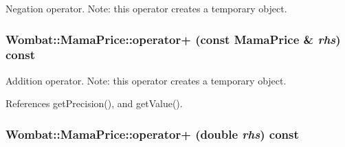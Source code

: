 Negation operator. Note: this operator creates a temporary object. \hypertarget{classWombat_1_1MamaPrice_a9ec014c02cdee65cf06c1e96e6338c92}{
\subsubsection[{operator+}]{ Wombat::MamaPrice::operator+ (const {\bf MamaPrice} \& {\em rhs}) const}}
\label{classWombat_1_1MamaPrice_a9ec014c02cdee65cf06c1e96e6338c92}


Addition operator. Note: this operator creates a temporary object. 

References getPrecision(), and getValue().\hypertarget{classWombat_1_1MamaPrice_ad82d8eca19c0f52557552965a9956cca}{
\subsubsection[{operator+}]{ Wombat::MamaPrice::operator+ (double {\em rhs}) const}}
\label{classWombat_1_1MamaPrice_ad82d8eca19c0f52557552965a9956cca}


